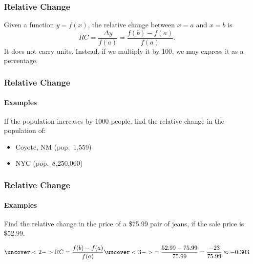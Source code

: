 \documentclass[9pt,xcolor=x11names,compress]{beamer}
\begin{document}
\begin{frame}[c]
\frametitle{Relative Change}

Given a function $y=f(x)$, the \alert{relative change} between $x=a$ and $x=b$ is 
\begin{equation*}
RC=\frac{\Delta y}{f(a)}=\frac{f(b)-f(a)}{f(a)}.
\end{equation*}
It does not carry units.  Instead, if we multiply it by 100, we may express it as a percentage.
\end{frame}

\begin{frame}[t]\frametitle{Relative Change}

\framesubtitle{Examples}

\begin{example}
If the population increases by 1000 people, find the relative change in the population of:
\begin{itemize}
\item Coyote, NM (pop.~1,559)
\item NYC (pop.~8,250,000)
\end{itemize}
\end{example}
\end{frame}

\begin{frame}[t]\frametitle{Relative Change}
    
\framesubtitle{Examples}

\begin{example}
Find the relative change in the price of a \$75.99 pair of jeans, if the sale price is \$52.99.
\end{example}
\begin{equation*}
\uncover<2->{\text{RC} = \frac{f(b) - f(a)}{f(a)}}\uncover<3->{= \frac{52.99 - 75.99}{75.99} = \frac{-23}{75.99} \approx -0.303}
\end{equation*}

\end{frame}
\end{document}
